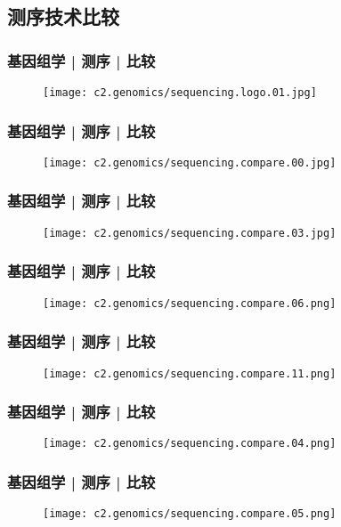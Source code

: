 \subsection{测序技术比较}
\begin{frame}
  \frametitle{基因组学 | 测序 | 比较}
  \begin{figure}
    \centering
    \texttt{[image: c2.genomics/sequencing.logo.01.jpg]}
  \end{figure}
\end{frame}

\begin{frame}
  \frametitle{基因组学 | 测序 | 比较}
  \begin{figure}
    \centering
    \texttt{[image: c2.genomics/sequencing.compare.00.jpg]}
  \end{figure}
\end{frame}

\begin{frame}
  \frametitle{基因组学 | 测序 | 比较}
  \begin{figure}
    \centering
    \texttt{[image: c2.genomics/sequencing.compare.03.jpg]}
  \end{figure}
\end{frame}

\begin{frame}
  \frametitle{基因组学 | 测序 | 比较}
  \begin{figure}
    \centering
    \texttt{[image: c2.genomics/sequencing.compare.06.png]}
  \end{figure}
\end{frame}

\begin{frame}
  \frametitle{基因组学 | 测序 | 比较}
  \begin{figure}
    \centering
    \texttt{[image: c2.genomics/sequencing.compare.11.png]}
  \end{figure}
\end{frame}

\begin{frame}
  \frametitle{基因组学 | 测序 | 比较}
  \begin{figure}
    \centering
    \texttt{[image: c2.genomics/sequencing.compare.04.png]}
  \end{figure}
\end{frame}

\begin{frame}
  \frametitle{基因组学 | 测序 | 比较}
  \begin{figure}
    \centering
    \texttt{[image: c2.genomics/sequencing.compare.05.png]}
  \end{figure}
\end{frame}

